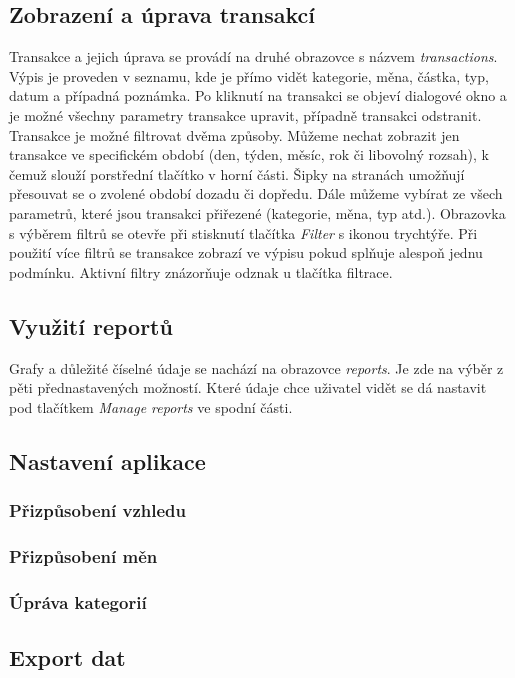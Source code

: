 \documentclass[
  biblatex,
  figures=true,
  tables=false,
  glossaries,
  index
]{kidiplom}
\begin{document}
\subsection{Zobrazení a úprava transakcí}
Transakce a jejich úprava se provádí na druhé obrazovce s názvem \textit{transactions}. Výpis je proveden v seznamu, kde je přímo vidět kategorie, měna, částka, typ, datum a případná poznámka. Po kliknutí na transakci se objeví dialogové okno a je možné všechny parametry transakce upravit, případně transakci odstranit. Transakce je možné filtrovat dvěma způsoby. Můžeme nechat zobrazit jen transakce ve specifickém období (den, týden, měsíc, rok či libovolný rozsah), k čemuž slouží porstřední tlačítko v horní části. Šipky na stranách umožňují přesouvat se o zvolené období dozadu či dopředu. Dále můžeme vybírat ze všech parametrů, které jsou transakci přiřezené (kategorie, měna, typ atd.). Obrazovka s výběrem filtrů se otevře při stisknutí tlačítka \textit{Filter} s ikonou trychtýře. Při použití více filtrů se transakce zobrazí ve výpisu pokud splňuje alespoň jednu podmínku. Aktivní filtry znázorňuje odznak u tlačítka filtrace.

\subsection{Využití reportů}
Grafy a důležité číselné údaje se nachází na obrazovce \textit{reports}. Je zde na výběr z pěti přednastavených možností. Které údaje chce uživatel vidět se dá nastavit pod tlačítkem \textit{Manage reports} ve spodní části. 

\subsection{Nastavení aplikace}

\subsubsection{Přizpůsobení vzhledu}

\subsubsection{Přizpůsobení měn}

\subsubsection{Úpráva kategorií}

\subsection{Export dat}
\end{document}
